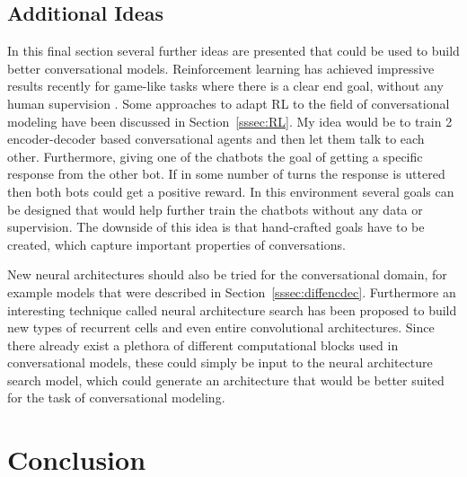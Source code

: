 \documentclass[12pt]{article}
\begin{document}
\subsection{Additional Ideas} \label{ssec:63}
In this final section several further ideas are presented that could be used to build better conversational models. Reinforcement learning has achieved impressive results recently for game-like tasks where there is a clear end goal, without any human supervision \cite{alphagozero}. Some approaches to adapt RL to the field of conversational modeling have been discussed in Section~\ref{sssec:RL}. My idea would be to train 2 encoder-decoder based conversational agents and then let them talk to each other. Furthermore, giving one of the chatbots the goal of getting a specific response from the other bot. If in some number of turns the response is uttered then both bots could get a positive reward. In this environment several goals can be designed that would help further train the chatbots without any data or supervision. The downside of this idea is that hand-crafted goals have to be created, which capture important properties of conversations.

New neural architectures should also be tried for the conversational domain, for example models that were described in Section~\ref{sssec:diffencdec}. Furthermore an interesting technique called neural architecture search \cite{Zoph:2016} has been proposed to build new types of recurrent cells and even entire convolutional architectures. Since there already exist a plethora of different computational blocks used in conversational models, these could simply be input to the neural architecture search model, which could generate an architecture that would be better suited for the task of conversational modeling.




\newpage\section{Conclusion} \label{sec:conclusion}
\end{document}
